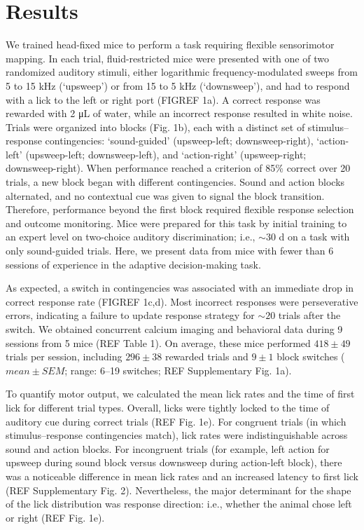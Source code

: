 \section{Results}


We trained head-fixed mice to perform a task requiring flexible sensorimotor mapping. In each trial, fluid-restricted mice were presented with one of two randomized auditory stimuli, either logarithmic frequency-modulated sweeps from 5 to 15 kHz (`upsweep') or from 15 to 5 kHz (`downsweep'), and had to respond with a lick to the left or right port (FIGREF 1a). A correct response was rewarded with 2 \si{\uL} of water, while an incorrect response resulted in white noise. Trials were organized into blocks (Fig. 1b), each with a distinct set of stimulus--response contingencies: `sound-guided' (upsweep-left; downsweep-right), `action-left' (upsweep-left; downsweep-left), and `action-right' (upsweep-right; downsweep-right). When performance reached a criterion of 85\% correct over 20 trials, a new block began with different contingencies. Sound and action blocks alternated, and no contextual cue was given to signal the block transition. Therefore, performance beyond the first block required flexible response selection and outcome monitoring. Mice were prepared for this task by initial training to an expert level on two-choice auditory discrimination; i.e., $\sim 30$ d on a task with only sound-guided trials. Here, we present data from mice with fewer than 6 sessions of experience in the adaptive decision-making task.



As expected, a switch in contingencies was associated with an immediate drop in correct response rate (FIGREF 1c,d). Most incorrect responses were perseverative errors, indicating a failure to update response strategy for $\sim 20$ trials after the switch. We obtained concurrent calcium imaging and behavioral data during 9 sessions from 5 mice (REF Table 1). On average, these mice performed $418 \pm 49$ trials per session, including $296 \pm 38$ rewarded trials and $9 \pm 1$ block switches ($mean \pm SEM$; range: 6–19 switches; REF Supplementary Fig. 1a). 

To quantify motor output, we calculated the mean lick rates and the time of first lick for different trial types. Overall, licks were tightly locked to the time of auditory cue during correct trials (REF Fig. 1e). For congruent trials (in which stimulus--response contingencies match), lick rates were indistinguishable across sound and action blocks. For incongruent trials (for example, left action for upsweep during sound block versus downsweep during action-left block), there was a noticeable difference in mean lick rates and an increased latency to first lick (REF Supplementary Fig. 2). Nevertheless, the major determinant for the shape of the lick distribution was response direction: i.e., whether the animal chose left or right (REF Fig. 1e). 

